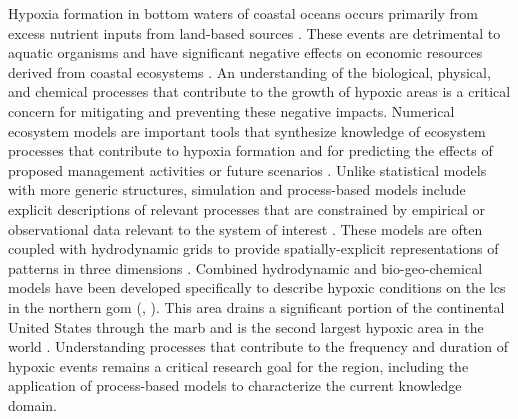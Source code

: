 \documentclass[letterpaper,12pt,oneside]{article}\usepackage[]{graphicx}\usepackage[]{color}
\begin{document}
Hypoxia formation in bottom waters of coastal oceans occurs primarily from excess nutrient inputs from land-based sources \citep{Justic87,Diaz95,Howarth96}.  These events are detrimental to aquatic organisms and have significant negative effects on economic resources derived from coastal ecosystems \citep{Lipton03,Diaz11}.  An understanding of the biological, physical, and chemical processes that contribute to the growth of hypoxic areas is a critical concern for mitigating and preventing these negative impacts.  Numerical ecosystem models are important tools that synthesize knowledge of ecosystem processes that contribute to hypoxia formation and for predicting the effects of proposed management activities or future scenarios \citep{Scavia04,Hagy07,Pauer16}.  Unlike statistical models with more generic structures, simulation and process-based models include explicit descriptions of relevant processes that are constrained by empirical or observational data relevant to the system of interest \citep[e.g.][]{Omlin01b,Eldridge10}.  These models are often coupled with hydrodynamic grids to provide spatially-explicit representations of patterns in three dimensions \citep{Warner05,Zhao10,Ganju16}. Combined hydrodynamic and bio-geo-chemical models have been developed specifically to describe hypoxic conditions on the \ac{lcs} in the northern \ac{gom} (\citealt{Fennel13,Obenour15,Pauer16}, ).  This area drains a significant portion of the continental United States through the \ac{marb} and is the second largest hypoxic area in the world \citep{Rabalais02}.  Understanding processes that contribute to the frequency and duration of hypoxic events remains a critical research goal for the region, including the application of process-based models to characterize the current knowledge domain.  
\end{document}
